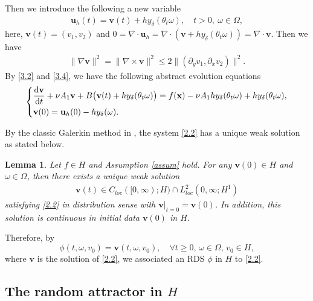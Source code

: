 \documentclass{elsarticle}
\newtheorem{lemma}[theorem]{Lemma}
\theoremstyle{definition}
\numberwithin{equation}{section}
\renewcommand{\d}{{\rm{d}}}
\begin{document}
Then we introduce the following a new variable
 \begin{align}\label{3.4}
\textbf{u}_h(t)=\textbf{v}(t)+hy_\delta(\theta_t\omega),\quad t>0,\ \omega\in \Omega,
\end{align}
here, $\textbf{v}(t)=(v_1,v_2)$ and $0=\nabla\cdot\textbf{u}_h=\nabla\cdot(\textbf{v}+hy_\delta(\theta_t\omega))=\nabla\cdot\textbf{v}$. Then we have
\begin{align}\label{3.9}
\|\nabla \textbf{v}\|^2=\|\nabla\times \textbf{v}\|^2\leq 2\|(\partial_yv_1,\partial_xv_2)\|^2.
\end{align}
 By \eqref{3.2} and \eqref{3.4}, we have the following   abstract evolution equations
\begin{align}\label{2.2}
\left\{
\begin{aligned}
&
\frac{\d \textbf{v}}{\d t}+ \nu A_1\textbf{v}+B\big( \textbf{v}(t)+hy_\delta(\theta_t\omega)\big)=f(\textbf{x})-  \nu A_1hy_\delta(\theta_t\omega)+hy_\delta (\theta_t\omega), \\
& \textbf{v}(0)=\textbf{u}_h(0)-hy_\delta (\omega).
\end{aligned}
\right.
\end{align}



By the classic Galerkin method in \cite{arnold,temam1}, the system \eqref{2.2} has a unique weak solution as stated below.
\begin{lemma}
Let $f\in H$ and Assumption \ref{assum} hold.  For any $\textbf{v}(0)\in H$ and $\omega\in\Omega$, then there exists a unique weak solution
\begin{align*}
\textbf{v} (t) \in C_{loc}([0,\infty);H)\cap L^2_{loc} (0,\infty;H^1 )
\end{align*}
satisfying \eqref{2.2} in distribution sense with $\textbf{v}|_{t=0}=\textbf{v}(0)$.  In addition, this solution is continuous in initial data $\textbf{v}(0)$ in $H$.
\end{lemma}


Therefore, by
\[
 \phi(t,\omega, v_0) =\textbf{v}(t,\omega,v_0),\quad  \forall t\geq 0,\, \omega\in \Omega, \, v_0\in H,
\]
where $\textbf{v}$ is the solution of \eqref{2.2},
we associated an RDS $\phi$ in $H$ to \eqref{2.2}.



\subsection{The random attractor in $H$}
\end{document}

